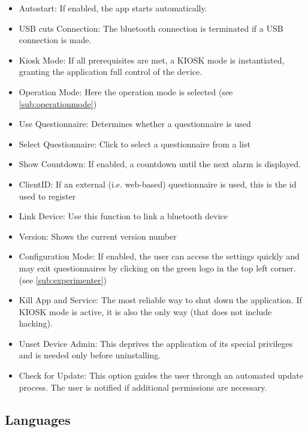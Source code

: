 \documentclass[11pt,a4paper,titlepage]{article}
\newcommand\ClrSquare[1]{\textcolor{#1}{\rule{7pt}{7pt}}}
\begin{document}
\begin{center}
\begin{tcolorbox}[colback=black!10!white,colframe=black!50!white, boxsep=1pt,left=4pt,right=14pt,top=4pt,bottom=2pt]
\begin{itemize}[label=\ClrSquare{jadeRed}]
	\item Autostart: If enabled, the app starts automatically.
	\item USB cuts Connection: The bluetooth connection is terminated if a USB connection is made. 
	\item Kiosk Mode: If all prerequisites are met, a KIOSK mode is instantiated, granting the application full control of the device.
	\item Operation Mode: Here the operation mode is selected (see \ref{sub:operationmode})
	\item Use Questionnaire: Determines whether a questionnaire is used
	\item Select Questionnaire: Click to select a questionnaire from a list 
	\item Show Countdown: If enabled, a countdown until the next alarm is displayed. 
	\item ClientID: If an external (i.e. web-based) questionnaire is used, this is the id used to register
	\item Link Device: Use this function to link a bluetooth device 
	\item Version: Shows the current version number
	\item Configuration Mode: If enabled, the user can access the settings quickly and may exit questionnaires by clicking on the green logo in the top left corner. (see \ref{sub:experimenter})
	\item Kill App and Service: The most reliable way to shut down the application. If KIOSK mode is active, it is also the only way (that does not include hacking).
	\item Unset Device Admin: This deprives the application of its special privileges and is needed only before uninstalling. 
	\item Check for Update: This option guides the user through an automated update process. The user is notified if additional permissions are necessary.
\end{itemize}
\end{tcolorbox}
\end{center}




\subsection{Languages}
\end{document}
